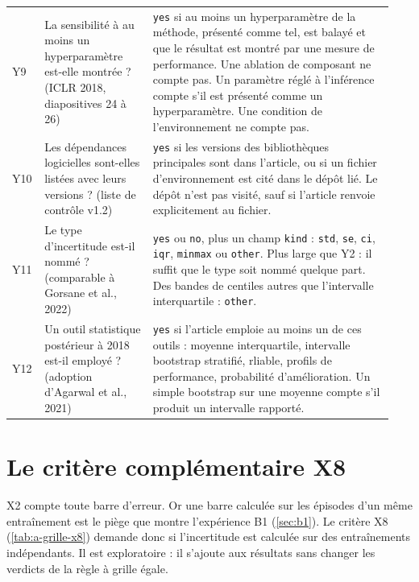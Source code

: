 \begin{small}
\begin{longtable}{@{}p{0.07\linewidth}>{\raggedright\arraybackslash}p{0.27\linewidth}>{\raggedright\arraybackslash}p{0.6\linewidth}@{}}
Y9 & La sensibilité à au moins un hyperparamètre est-elle montrée ? (ICLR 2018, diapositives 24 à
  26) & \texttt{yes} si au moins un hyperparamètre de la méthode, présenté comme tel, est balayé et
  que le résultat est montré par une mesure de performance. Une ablation de composant ne compte pas.
  Un paramètre réglé à l'inférence compte s'il est présenté comme un hyperparamètre. Une condition
  de l'environnement ne compte pas. \\
Y10 & Les dépendances logicielles sont-elles listées avec leurs versions ? (liste de contrôle v1.2)
  & \texttt{yes} si les versions des bibliothèques principales sont dans l'article, ou si un fichier
  d'environnement est cité dans le dépôt lié. Le dépôt n'est pas visité, sauf si l'article renvoie
  explicitement au fichier. \\
Y11 & Le type d'incertitude est-il nommé ? (comparable à Gorsane et al., 2022) & \texttt{yes} ou
  \texttt{no}, plus un champ \texttt{kind} : \texttt{std}, \texttt{se}, \texttt{ci}, \texttt{iqr},
  \texttt{minmax} ou \texttt{other}. Plus large que Y2 : il suffit que le type soit nommé quelque
  part. Des bandes de centiles autres que l'intervalle interquartile : \texttt{other}. \\
Y12 & Un outil statistique postérieur à 2018 est-il employé ? (adoption d'Agarwal et al., 2021) &
  \texttt{yes} si l'article emploie au moins un de ces outils : moyenne interquartile, intervalle
  bootstrap stratifié, rliable, profils de performance, probabilité d'amélioration. Un simple
  bootstrap sur une moyenne compte s'il produit un intervalle rapporté. \\
\end{longtable}
\end{small}

\section{Le critère complémentaire X8}
\label{sec:a-x8}

X2 compte toute barre d'erreur. Or une barre calculée sur les épisodes d'un même entraînement est le
piège que montre l'expérience B1 (\cref{sec:b1}). Le critère X8 (\cref{tab:a-grille-x8}) demande donc si l'incertitude est
calculée sur des entraînements indépendants. Il est exploratoire : il s'ajoute aux résultats sans
changer les verdicts de la règle à grille égale.

